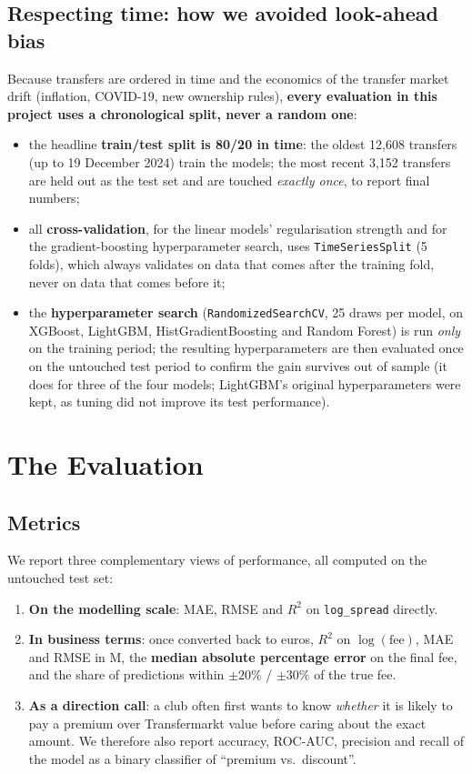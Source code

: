 \documentclass[11pt]{article}
\begin{document}
\subsection{Respecting time: how we avoided look-ahead bias}
Because transfers are ordered in time and the economics of the transfer
market drift (inflation, COVID-19, new ownership rules), \textbf{every
evaluation in this project uses a chronological split, never a random one}:
\begin{itemize}
    \item the headline \textbf{train/test split is 80/20 in time}: the oldest
    12{,}608 transfers (up to 19 December 2024) train the models; the most
    recent 3{,}152 transfers are held out as the test set and are touched
    \emph{exactly once}, to report final numbers;
    \item all \textbf{cross-validation}, for the linear models' regularisation
    strength and for the gradient-boosting hyperparameter search, uses
    \texttt{TimeSeriesSplit} (5 folds), which always validates on data that
    comes after the training fold, never on data that comes before it;
    \item the \textbf{hyperparameter search} (\texttt{RandomizedSearchCV}, 25
    draws per model, on XGBoost, LightGBM, HistGradientBoosting and Random
    Forest) is run \emph{only} on the training period; the resulting
    hyperparameters are then evaluated once on the untouched test period to
    confirm the gain survives out of sample (it does for three of the four
    models; LightGBM's original hyperparameters were kept, as tuning did not
    improve its test performance).
\end{itemize}

\section{The Evaluation}

\subsection{Metrics}
We report three complementary views of performance, all computed on the
untouched test set:
\begin{enumerate}
    \item \textbf{On the modelling scale}: MAE, RMSE and $R^2$ on
    \texttt{log\_spread} directly.
    \item \textbf{In business terms}: once converted back to euros, $R^2$ on
    $\log(\text{fee})$, MAE and RMSE in \texteuro{}M, the \textbf{median absolute
    percentage error} on the final fee, and the share of predictions within
    $\pm 20\%$ / $\pm 30\%$ of the true fee.
    \item \textbf{As a direction call}: a club often first wants to know
    \emph{whether} it is likely to pay a premium over Transfermarkt value
    before caring about the exact amount. We therefore also report accuracy,
    ROC-AUC, precision and recall of the model as a binary classifier of
    ``premium vs.\ discount''.
\end{enumerate}
\end{document}
